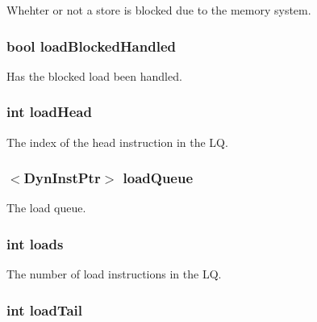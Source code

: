 \label{classLSQUnit_a89d931c74b63e0b0e7ad856fe9525ff6}
Whehter or not a store is blocked due to the memory system. \hypertarget{classLSQUnit_a2c1620029c162c7180e523b089e56ed5}{
\subsubsection[{loadBlockedHandled}]{\setlength{\rightskip}{0pt plus 5cm}bool {\bf loadBlockedHandled}}}
\label{classLSQUnit_a2c1620029c162c7180e523b089e56ed5}
Has the blocked load been handled. \hypertarget{classLSQUnit_ac09af89928d2ef4da4cbdcfce26fa3f5}{
\subsubsection[{loadHead}]{\setlength{\rightskip}{0pt plus 5cm}int {\bf loadHead}}}
\label{classLSQUnit_ac09af89928d2ef4da4cbdcfce26fa3f5}
The index of the head instruction in the LQ. \hypertarget{classLSQUnit_aa5f3703c5d7c5ce21a497352b94c7465}{
\subsubsection[{loadQueue}]{$<${\bf DynInstPtr}$>$ {\bf loadQueue}}}
\label{classLSQUnit_aa5f3703c5d7c5ce21a497352b94c7465}
The load queue. \hypertarget{classLSQUnit_a867971f18e464abd16193e069c64a8ad}{
\subsubsection[{loads}]{\setlength{\rightskip}{0pt plus 5cm}int {\bf loads}}}
\label{classLSQUnit_a867971f18e464abd16193e069c64a8ad}
The number of load instructions in the LQ. \hypertarget{classLSQUnit_a973a489225da164cc85e690f13c86841}{
\subsubsection[{loadTail}]{\setlength{\rightskip}{0pt plus 5cm}int {\bf loadTail}}}
